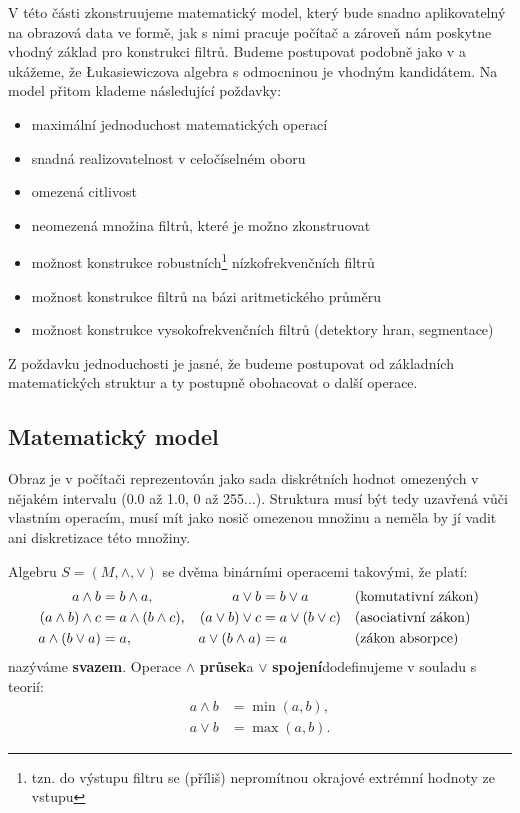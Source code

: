     V této části zkonstruujeme matematický model, který bude snadno aplikovatelný na obrazová data ve formě, jak s nimi pracuje počítač a zároveň nám poskytne vhodný základ pro konstrukci filtrů. Budeme postupovat podobně jako v \cite{MajerovaPhD} a ukážeme, že \L ukasiewiczova algebra s odmocninou je vhodným kandidátem. Na model přitom klademe následující poždavky:
    \begin{itemize}
      \item maximální jednoduchost matematických operací
      \item snadná realizovatelnost v celočíselném oboru
      \item omezená citlivost
      \item neomezená množina filtrů, které je možno zkonstruovat
      \item možnost konstrukce robustních\footnote{tzn. do výstupu filtru se (příliš) nepromítnou okrajové extrémní hodnoty ze vstupu} nízkofrekvenčních filtrů
      \item možnost konstrukce filtrů na bázi aritmetického průměru
      \item možnost konstrukce vysokofrekvenčních filtrů (detektory hran, segmentace)
    \end{itemize}
    Z poždavku jednoduchosti je jasné, že budeme postupovat od základních matematických struktur a ty postupně obohacovat o další operace.

    \subsection{Matematický model}

    Obraz je v počítači reprezentován jako sada diskrétních hodnot omezených v nějakém intervalu (0.0 až 1.0, 0 až 255...). Struktura musí být tedy uzavřená vůči vlastním operacím, musí mít jako nosič omezenou množinu a neměla by jí vadit ani diskretizace této množiny.

    \begin{define}\label{svaz}
    Algebru $S = (M,\wedge,\vee)$ se dvěma binárními operacemi takovými, že platí:
    \begin{align}
    a \wedge b &= b \wedge a, & a \vee b &= b \vee a &&\text{\textup{(}komutativní zákon\textup{)\,}} \\
    (a \wedge b) \wedge c &= a \wedge (b \wedge c), & (a \vee b) \vee c &= a \vee (b \vee c) &&\text{\textup{(}asociativní zákon\textup{)\,}} \\
    a \wedge (b \vee a) &= a,& a \vee (b \wedge a) &= a &&\text{\textup{(}zákon absorpce\textup{)\,}}
    \end{align}
    nazýváme \textbf{svazem}. Operace $\wedge$ \rl\textbf{průsek}\rr a $\vee$ \rl\textbf{spojení}\rr dodefinujeme v souladu s teorií:
    \begin{align}
    a \wedge b &= \min(a,b), \\
    a \vee b &= \max(a,b).
    \end{align}
    \end{define}

